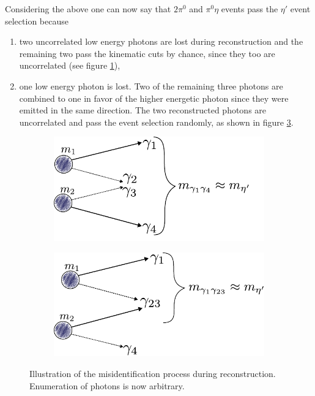 Considering the above one can now say that $2\pi^0$ and $\pi^0\eta$ events pass the $\eta'$ event selection because 
\begin{enumerate}
	\item two uncorrelated low energy photons are lost during reconstruction and the remaining two pass the kinematic cuts by chance, since they too are uncorrelated (see figure \ref{fig:mcgammas1}),

	\item one low energy photon is lost. Two of the remaining three photons are combined to one in favor of the higher energetic photon since they were emitted in the same direction. The two reconstructed photons are uncorrelated and pass the event selection randomly, as shown in figure \ref{fig:mcgammas2}.
\end{enumerate} 
	\begin{figure}[h]
	\centering
	\begin{subfigure}{.49\linewidth}
		\includegraphics[width=\linewidth]{../figs/inkscape/mcgammas1.pdf}
		\label{fig:mcgammas1}
	\end{subfigure}
	\begin{subfigure}{.49\linewidth}
		\includegraphics[width=\linewidth]{../figs/inkscape/mcgammas2.pdf}
		\label{fig:mcgammas2}
	\end{subfigure}
	\caption{Illustration of the misidentification process during reconstruction. Enumeration of photons is now arbitrary.}

\end{figure}
